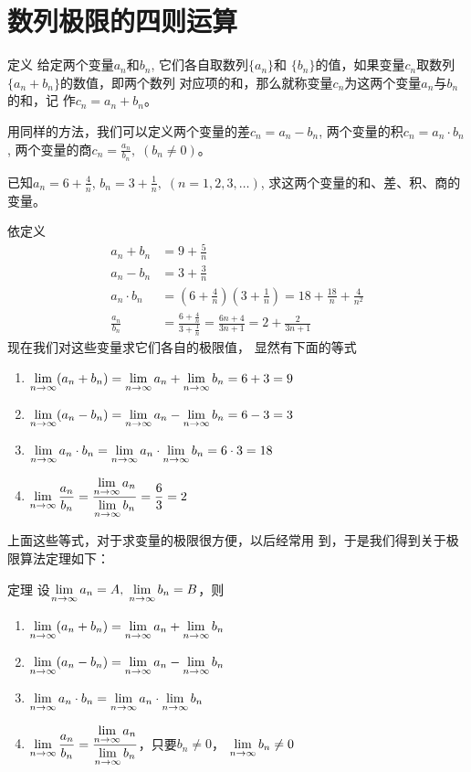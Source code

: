 \section{数列极限的四则运算}
\begin{blk}{定义}
 给定两个变量$a_n$和$b_n$, 它们各自取数列$\{a_n\}$和
$\{b_n\}$的值，如果变量$c_n$取数列$\{a_n+b_n\}$的数值，即两个数列
对应项的和，那么就称变量$c_n$为这两个变量$a_n$与$b_n$的和，记
作$c_n=a_n+b_n$。   
\end{blk}
 
用同样的方法，我们可以定义两个变量的差$c_n=a_n-b_n$,
 两个变量的积$c_n=a_n\cdot b_n$, 两个变量的商$c_n=\frac{a_n}{b_n},\; (b_n\ne 0)$。



\begin{example}
    已知$a_n=6+\frac{4}{n}$, $b_n=3+\frac{1}{n},\; (n=1,2,3,
\ldots)$, 求这两个变量的和、差、积、商的变量。
\end{example}

\begin{solution}
    依定义
\[\begin{split}
    a_n+b_n&=9+\frac{5}{n}\\
a_n-b_n&=3+\frac{3}{n}\\
a_n\cdot b_n&=\left(6+\frac{4}{n}\right)\left(3+\frac{1}{n}\right)=18+\frac{18}{n}+\frac{4}{n^2}\\
\frac{a_n}{b_n}&=\frac{6+\frac{4}{n}}{3+\frac{1}{n}}=\frac{6n+4}{3n+1}=2+\frac{2}{3n+1}
\end{split}\]
现在我们对这些变量求它们各自的极限值，
显然有下面的等式
\begin{enumerate}
    \item $\displaystyle\lim_{n\to\infty}(a_n+b_n)=\displaystyle\lim_{n\to\infty}a_n+\displaystyle\lim_{n\to\infty}b_n=6+3=9$
    \item $\displaystyle\lim_{n\to\infty}(a_n-b_n)=\displaystyle\lim_{n\to\infty}a_n-\displaystyle\lim_{n\to\infty}b_n=6-3=3$
    \item $\displaystyle\lim_{n\to\infty}a_n\cdot b_n=\displaystyle\lim_{n\to\infty}a_n\cdot \displaystyle\lim_{n\to\infty}b_n=6\cdot 3=18$
    \item $\displaystyle\lim_{n\to\infty}\dfrac{a_n}{b_n}=\dfrac{\displaystyle\lim_{n\to\infty}a_n}{\displaystyle\lim_{n\to\infty}b_n}=\dfrac{6}{3}=2$
\end{enumerate}
\end{solution}

上面这些等式，对于求变量的极限很方便，以后经常用
到，于是我们得到关于极限算法定理如下：

\begin{blk}{定理}
设$\displaystyle\lim_{n\to\infty}a_n=A,\; \displaystyle\lim_{n\to\infty}b_n=B$，则
\begin{enumerate}
    \item $\displaystyle\lim_{n\to\infty}(a_n+b_n)=\displaystyle\lim_{n\to\infty}a_n+\displaystyle\lim_{n\to\infty}b_n$
    \item $\displaystyle\lim_{n\to\infty}(a_n-b_n)=\displaystyle\lim_{n\to\infty}a_n-\displaystyle\lim_{n\to\infty}b_n$
    \item $\displaystyle\lim_{n\to\infty}a_n\cdot b_n=\displaystyle\lim_{n\to\infty}a_n\cdot \displaystyle\lim_{n\to\infty}b_n$
    \item $\displaystyle\lim_{n\to\infty}\dfrac{a_n}{b_n}=\dfrac{\displaystyle\lim_{n\to\infty}a_n}{\displaystyle\lim_{n\to\infty}b_n}$，只要$b_n\ne 0$， $\displaystyle\lim_{n\to\infty}b_n\ne 0$
\end{enumerate}
 \end{blk}

